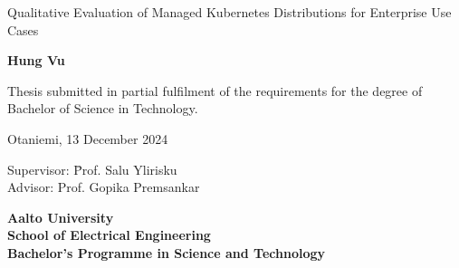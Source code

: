 \thispagestyle{empty}

{\parindent0pt %
\begin{spacing}{1.1}

 {\sffamily{}}
\end{spacing}

\vspace{12.7mm}

\begin{spacing}{1.63}
{\fontsize{17.8pt}{17.8pt}\selectfont Qualitative Evaluation of Managed Kubernetes Distributions for Enterprise Use Cases}
\end{spacing}

\vspace{10.5mm}

\begin{spacing}{1.2}
{\fontsize{13pt}{13pt}\selectfont }
\end{spacing}

\vspace{10.6mm}

{\fontsize{13.9pt}{13.9pt}\bfseries\sffamily\lsstyle Hung Vu}

\vfill

{\fontsize{10.3pt}{10.3pt}\sffamily\lsstyle\raggedright
\begin{spacing}{1.06}

Thesis submitted in partial fulfilment of the requirements for the
degree of Bachelor of Science in Technology.

Otaniemi, 13 December 2024

\begin{tabbing}
Supervisor:\hspace{6mm} \= Prof. Salu Ylirisku\\
Advisor: \> Prof. Gopika Premsankar
\end{tabbing}
\vspace{-4mm}
\end{spacing}
} %

\vspace{11.5mm}

\begin{spacing}{.9}
{\bfseries\sffamily\lsstyle Aalto University \\
School of Electrical Engineering \\
Bachelor’s Programme in Science and Technology}
\end{spacing}
} %



